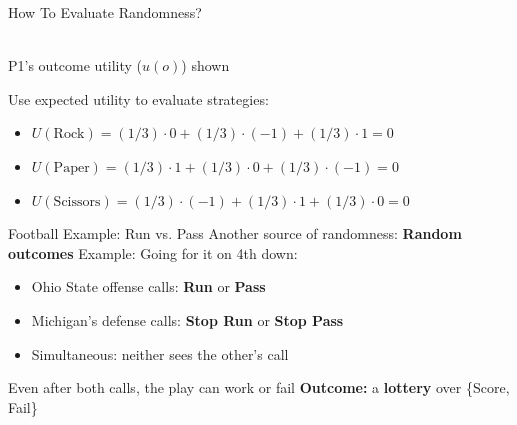 \begin{frame}{How To Evaluate Randomness?}
\begin{center}
\begin{matrixgame}[top={R ($1/3$),P ($1/3$),S ($1/3$)}, left={Rock,Paper,Scissors}]
\end{matrixgame}\\
P1's outcome utility ($u(o)$) shown
\end{center}
\bsk
Use expected utility to evaluate strategies:
\begin{itemize}
    \item $U(\text{Rock}) = (1/3)\cdot 0+(1/3)\cdot(-1)+(1/3)\cdot 1 = 0$
    \item $U(\text{Paper}) = (1/3)\cdot 1 + (1/3)\cdot 0 + (1/3)\cdot(-1) = 0 $
    \item $U(\text{Scissors}) = (1/3)\cdot (-1)+(1/3)\cdot 1+(1/3)\cdot 0 = 0$
\end{itemize}
\end{frame}

\begin{frame}{Football Example: Run vs. Pass}
Another source of randomness: \textbf{Random outcomes}
\bsk
Example: Going for it on 4th down:
\bsk
\begin{itemize}
    \item Ohio State offense calls: \textbf{Run} or \textbf{Pass}
    \item Michigan's defense calls: \textbf{Stop Run} or \textbf{Stop Pass}
    \item Simultaneous: neither sees the other's call
\end{itemize}
\bsk
Even after both calls, the play can work or fail
\bsk
\textbf{Outcome:} a \textbf{lottery} over \{Score, Fail\}
\vfill
\vspace{-0.2in}
\end{frame}

